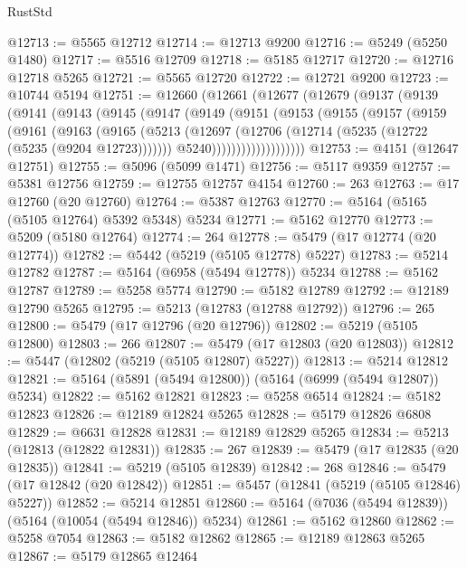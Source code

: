 \begin{lexlean}{RustStd}
\begin{coremodule}
@12713 := @5565 @12712
@12714 := @12713 @9200
@12716 := @5249 (@5250 @1480)
@12717 := @5516 @12709
@12718 := @5185 @12717
@12720 := @12716 @12718 @5265
@12721 := @5565 @12720
@12722 := @12721 @9200
@12723 := @10744 @5194
@12751 := @12660
    (@12661
      (@12677
        (@12679
          (@9137
            (@9139
              (@9141
                (@9143
                  (@9145
                    (@9147
                      (@9149
                        (@9151
                          (@9153
                            (@9155
                              (@9157
                                (@9159
                                  (@9161
                                    (@9163
                                      (@9165
                                        (@5213
                                          (@12697
                                            (@12706
                                              (@12714 (@5235 (@12722 (@5235 (@9204 @12723)))))))
                                          @5240)))))))))))))))))))
@12753 := @4151 (@12647 @12751)
@12755 := @5096 (@5099 @1471)
@12756 := @5117 @9359
@12757 := @5381 @12756
@12759 := @12755 @12757 @4154
@12760 := 263
@12763 := @17 @12760 (@20 @12760)
@12764 := @5387 @12763
@12770 := @5164 (@5165 (@5105 @12764) @5392 @5348) @5234
@12771 := @5162 @12770
@12773 := @5209 (@5180 @12764)
@12774 := 264
@12778 := @5479 (@17 @12774 (@20 @12774))
@12782 := @5442 (@5219 (@5105 @12778) @5227)
@12783 := @5214 @12782
@12787 := @5164 (@6958 (@5494 @12778)) @5234
@12788 := @5162 @12787
@12789 := @5258 @5774
@12790 := @5182 @12789
@12792 := @12189 @12790 @5265
@12795 := @5213 (@12783 (@12788 @12792))
@12796 := 265
@12800 := @5479 (@17 @12796 (@20 @12796))
@12802 := @5219 (@5105 @12800)
@12803 := 266
@12807 := @5479 (@17 @12803 (@20 @12803))
@12812 := @5447 (@12802 (@5219 (@5105 @12807) @5227))
@12813 := @5214 @12812
@12821 := @5164 (@5891 (@5494 @12800)) (@5164 (@6999 (@5494 @12807)) @5234)
@12822 := @5162 @12821
@12823 := @5258 @6514
@12824 := @5182 @12823
@12826 := @12189 @12824 @5265
@12828 := @5179 @12826 @6808
@12829 := @6631 @12828
@12831 := @12189 @12829 @5265
@12834 := @5213 (@12813 (@12822 @12831))
@12835 := 267
@12839 := @5479 (@17 @12835 (@20 @12835))
@12841 := @5219 (@5105 @12839)
@12842 := 268
@12846 := @5479 (@17 @12842 (@20 @12842))
@12851 := @5457 (@12841 (@5219 (@5105 @12846) @5227))
@12852 := @5214 @12851
@12860 := @5164 (@7036 (@5494 @12839)) (@5164 (@10054 (@5494 @12846)) @5234)
@12861 := @5162 @12860
@12862 := @5258 @7054
@12863 := @5182 @12862
@12865 := @12189 @12863 @5265
@12867 := @5179 @12865 @12464

\end{coremodule}
\end{lexlean}
